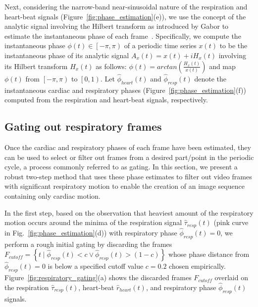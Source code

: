 \documentclass[journal]{IEEEtran}
\begin{document}
Next, considering the narrow-band near-sinusoidal nature of the respiration and heart-beat signals (Figure~\ref{fig:phase_estimation}(e)), we use the concept of the analytic signal involving the Hilbert transform as introduced by Gabor to estimate the instantaneous phase of each frame~\cite{Gabor1946,Bracewell1986,Rosenblum2001,Freund2003,Kuklik2015}. Specifically, we compute the instantaneous phase $\phi(t) \in \left [  -\pi, \pi\right )$ of a periodic time series $x(t)$ to be the instantaneous phase of its analytic signal $A_x(t) = x(t) + i H_x(t)$ involving its Hilbert transform $H_x(t)$ as follows: $\phi(t) = arctan \left( \frac{H_x(t)}{x(t)}\right)$ and map $\phi(t)$ from $\left [  -\pi, \pi\right )$ to $\left [  0, 1\right )$. Let $\hat{\phi}_{heart}(t)$ and $\hat{\phi}_{resp}(t)$ denote the instantaneous cardiac and respiratory phases (Figure~\ref{fig:phase_estimation}(f)) computed from the respiration and heart-beat signals, respectively.
%
\subsection{Gating out respiratory frames}
\label{sec:method:gating}
%
Once the cardiac and respiratory phases of each frame have been estimated, they can be used to select or filter out frames from a desired part/point in the periodic cycle, a process commonly referred to as gating. In this section, we present a robust two-step method that uses these phase estimates to filter out video frames with significant respiratory motion to enable the creation of an image sequence containing only cardiac motion.

In the first step, based on the observation that heaviest amount of the respiratory motion occurs around the minima of the respiration signal $\hat{\tau}_{resp}(t)$ (pink curve in Fig.~\ref{fig:phase_estimation}(d)) with respiratory phase $\hat{\phi}_{resp}(t) = 0$, we perform a rough initial gating by discarding the frames $F_{cutoff} = \left \{ t \mid \hat{\phi}_{resp}(t) < c \vee \hat{\phi}_{resp}(t) > (1 - c) \right \}$ whose phase distance from $\hat{\phi}_{resp}(t) = 0$ is below a specified cutoff value $c=0.2$ chosen empirically. Figure~\ref{fig:respiratory_gating}(a) shows the discarded frames $F_{cutoff}$ overlaid on the respiration $\hat{\tau}_{resp}(t)$, heart-beat  $\hat{r}_{heart}(t)$, and respiratory phase $\hat{\phi}_{resp}(t)$ signals.
\end{document}
